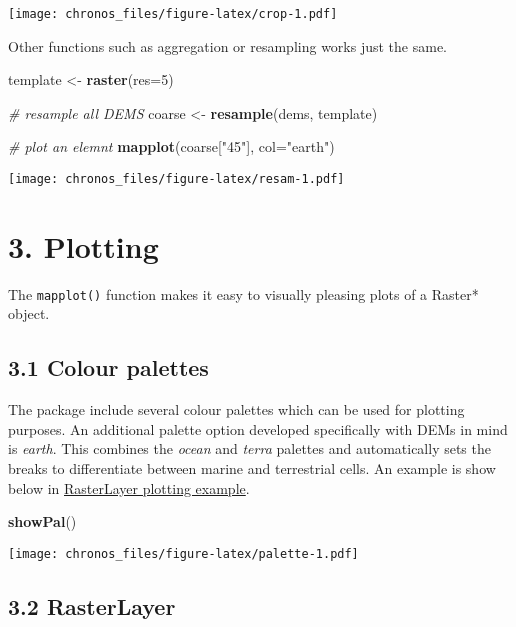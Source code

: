 \documentclass[]{article}
\newenvironment{Shaded}{\begin{snugshade}}{\end{snugshade}}
\newcommand{\KeywordTok}[1]{\textcolor[rgb]{0.13,0.29,0.53}{\textbf{#1}}}
\newcommand{\DataTypeTok}[1]{\textcolor[rgb]{0.13,0.29,0.53}{#1}}
\newcommand{\DecValTok}[1]{\textcolor[rgb]{0.00,0.00,0.81}{#1}}
\newcommand{\StringTok}[1]{\textcolor[rgb]{0.31,0.60,0.02}{#1}}
\newcommand{\CommentTok}[1]{\textcolor[rgb]{0.56,0.35,0.01}{\textit{#1}}}
\newcommand{\NormalTok}[1]{#1}
\begin{document}
\texttt{[image: chronos\_files/figure-latex/crop-1.pdf]}

Other functions such as aggregation or resampling works just the same.

\begin{Shaded}
\begin{Highlighting}[]
\NormalTok{template <-}\StringTok{ }\KeywordTok{raster}\NormalTok{(}\DataTypeTok{res=}\DecValTok{5}\NormalTok{)}

\CommentTok{# resample all DEMS}
\NormalTok{coarse <-}\StringTok{ }\KeywordTok{resample}\NormalTok{(dems, template)}

\CommentTok{# plot an elemnt}
\KeywordTok{mapplot}\NormalTok{(coarse[}\StringTok{"45"}\NormalTok{], }\DataTypeTok{col=}\StringTok{"earth"}\NormalTok{)}
\end{Highlighting}
\end{Shaded}

\texttt{[image: chronos\_files/figure-latex/resam-1.pdf]}

\section{3. Plotting}\label{plotting}

The \texttt{mapplot()} function makes it easy to visually pleasing plots
of a Raster* object.

\subsection{3.1 Colour palettes}\label{colour-palettes}

The package include several colour palettes which can be used for
plotting purposes. An additional palette option developed specifically
with DEMs in mind is \emph{earth}. This combines the \emph{ocean} and
\emph{terra} palettes and automatically sets the breaks to differentiate
between marine and terrestrial cells. An example is show below in
\protect\hyperlink{RasterLayer}{RasterLayer plotting example}.

\begin{Shaded}
\begin{Highlighting}[]
\KeywordTok{showPal}\NormalTok{()}
\end{Highlighting}
\end{Shaded}

\texttt{[image: chronos\_files/figure-latex/palette-1.pdf]}

\hypertarget{RasterLayer}{\subsection{3.2
RasterLayer}\label{RasterLayer}}
\end{document}

